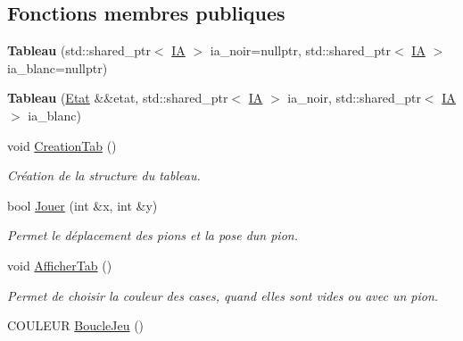 \subsection*{Fonctions membres publiques}
\begin{DoxyCompactItemize}
\item 
{\bfseries Tableau} (std\+::shared\+\_\+ptr$<$ \hyperlink{classIA}{IA} $>$ ia\+\_\+noir=nullptr, std\+::shared\+\_\+ptr$<$ \hyperlink{classIA}{IA} $>$ ia\+\_\+blanc=nullptr)\hypertarget{classTableau_a4b7923326eb0e5e2d1d2f8acf6445545}{}\label{classTableau_a4b7923326eb0e5e2d1d2f8acf6445545}

\item 
{\bfseries Tableau} (\hyperlink{structEtat}{Etat} \&\&etat, std\+::shared\+\_\+ptr$<$ \hyperlink{classIA}{IA} $>$ ia\+\_\+noir, std\+::shared\+\_\+ptr$<$ \hyperlink{classIA}{IA} $>$ ia\+\_\+blanc)\hypertarget{classTableau_adc95e4c3d822d09af273e29294313ac4}{}\label{classTableau_adc95e4c3d822d09af273e29294313ac4}

\item 
void \hyperlink{classTableau_a8e8311ab52129da568acc092598b22c7}{Creation\+Tab} ()\hypertarget{classTableau_a8e8311ab52129da568acc092598b22c7}{}\label{classTableau_a8e8311ab52129da568acc092598b22c7}

\begin{DoxyCompactList}\small\item\em Création de la structure du tableau. \end{DoxyCompactList}\item 
bool \hyperlink{classTableau_a564072da82e057d02ad7edbee98e6e43}{Jouer} (int \&x, int \&y)\hypertarget{classTableau_a564072da82e057d02ad7edbee98e6e43}{}\label{classTableau_a564072da82e057d02ad7edbee98e6e43}

\begin{DoxyCompactList}\small\item\em Permet le déplacement des pions et la pose d\textquotesingle{}un pion. \end{DoxyCompactList}\item 
void \hyperlink{classTableau_a422f7b27c74ca34d81ef3446e0d88bb7}{Afficher\+Tab} ()\hypertarget{classTableau_a422f7b27c74ca34d81ef3446e0d88bb7}{}\label{classTableau_a422f7b27c74ca34d81ef3446e0d88bb7}

\begin{DoxyCompactList}\small\item\em Permet de choisir la couleur des cases, quand elles sont vides ou avec un pion. \end{DoxyCompactList}\item 
C\+O\+U\+L\+E\+UR \hyperlink{classTableau_aae276afa0929c10f4c9a37c61a6166a9}{Boucle\+Jeu} ()\hypertarget{classTableau_aae276afa0929c10f4c9a37c61a6166a9}{}\label{classTableau_aae276afa0929c10f4c9a37c61a6166a9}


\end{DoxyCompactItemize}
